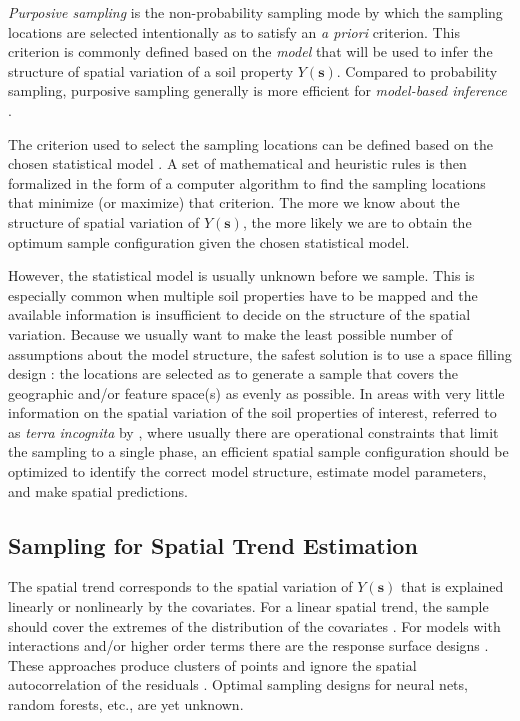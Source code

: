 \emph{Purposive sampling} is the non-probability sampling mode by which the sampling locations are selected 
intentionally as to satisfy an \textit{a priori} criterion. This criterion is commonly defined based on the 
\emph{model} that will be used to infer the structure of spatial variation of a soil property 
$Y(\boldsymbol{s})$. Compared to probability sampling, purposive sampling generally is more efficient for 
\emph{model-based inference} \cite{deGruijterEtAl2006}.

The criterion used to select the sampling locations can be defined based on the chosen statistical model 
\cite{deGruijterEtAl2006, Mueller2007, WebsterEtAl2013}. A set of mathematical and heuristic rules is then 
formalized in the form of a computer algorithm to find the sampling locations that minimize (or maximize) that 
criterion. The more we know about the structure of spatial variation of $Y(\boldsymbol{s})$, the more likely we 
are to obtain the optimum sample configuration given the chosen statistical model.

However, the statistical model is usually unknown before we sample. This is especially common when multiple 
soil properties have to be mapped and the available information is insufficient to decide on the structure of 
the spatial variation. Because we usually want to make the least possible number of assumptions about the model 
structure, the safest solution is to use a space filling design \cite{HenglEtAl2003a, deGruijterEtAl2006, 
Mueller2007, WalvoortEtAl2010}: the locations are selected as to generate a sample that covers the geographic 
and/or feature space(s) as evenly as possible. In areas with very little information on the spatial variation 
of the soil properties of interest, referred to as \emph{terra incognita} by \citet{WebsterEtAl2007}, where 
usually there are operational constraints that limit the sampling to a single phase, an efficient spatial 
sample configuration should be optimized to identify the correct model structure, estimate model parameters, 
and make spatial predictions.

\subsection{Sampling for Spatial Trend Estimation}

The spatial trend corresponds to the spatial variation of $Y(\boldsymbol{s})$ that is explained linearly or 
nonlinearly by the covariates. For a linear spatial trend, the sample should cover the extremes of the 
distribution of the covariates \cite{Mueller2007}. For models with interactions and/or higher order terms there 
are the response surface designs \cite{BoxEtAl1951, LeschEtAl1995}. These approaches produce clusters of points 
and ignore the spatial autocorrelation of the residuals \cite{BrusEtAl2007a, Mueller2007}. Optimal sampling 
designs for neural nets, random forests, etc., are yet unknown.

